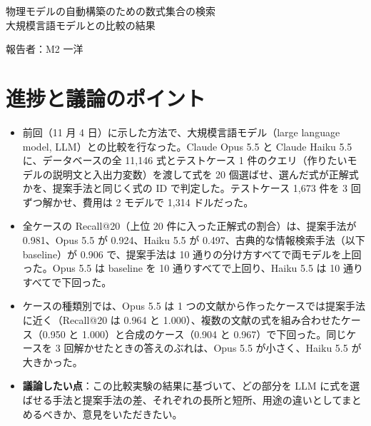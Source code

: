 \documentclass[a4j,dvipdfmx,10pt]{jresume}
\begin{document}

\medskip
\begin{center}
  {\Large 物理モデルの自動構築のための数式集合の検索\\ 大規模言語モデルとの比較の結果}
\end{center}

\begin{flushright}
  報告者：M2\; 一洋 \\
\end{flushright}

\begin{abstract}
本研究の目的は、複数の情報源から収集した数式の中から、作りたいモデルに使える可能性の高い数式を提示する手法を開発することである。提案手法は、第 1 段で数式を作りたいモデルの説明文との近さと入出力変数の重複率で採点して上位 $N_1$ 件に絞り、第 2 段で多層パーセプトロンで並べ直して上位 20 件を提示する。本報告では、2 つの大規模言語モデルに全 11{,}146 式を渡して式を選ばせ、提案手法と比べた。1{,}731 ケースで評価した結果、上位 20 件に入った正解式の割合は、提案手法が 0.981、Claude Opus 5.5 が 0.924、Claude Haiku 5.5 が 0.497 であり、提案手法が 10 通りの分け方すべてで両モデルを上回った。Opus 5.5 は、1 つの文献から作ったケースでは提案手法に近く、複数の文献の式を組み合わせたケースと合成のケースで下回った。
\end{abstract}

\section{進捗と議論のポイント}
\begin{itemize}[leftmargin=1.5em]
  \item 前回（11 月 4 日）に示した方法で、大規模言語モデル（large language model, LLM）との比較を行なった。Claude Opus 5.5 と Claude Haiku 5.5 に、データベースの全 11{,}146 式とテストケース 1 件のクエリ（作りたいモデルの説明文と入出力変数）を渡して式を 20 個選ばせ、選んだ式が正解式かを、提案手法と同じく式の ID で判定した。テストケース 1{,}673 件を 3 回ずつ解かせ、費用は 2 モデルで 1{,}314 ドルだった。
  \item 全ケースの Recall@20（上位 20 件に入った正解式の割合）は、提案手法が 0.981、Opus 5.5 が 0.924、Haiku 5.5 が 0.497、古典的な情報検索手法（以下 baseline）が 0.906 で、提案手法は 10 通りの分け方すべてで両モデルを上回った。Opus 5.5 は baseline を 10 通りすべてで上回り、Haiku 5.5 は 10 通りすべてで下回った。
  \item ケースの種類別では、Opus 5.5 は 1 つの文献から作ったケースでは提案手法に近く（Recall@20 は 0.964 と 1.000）、複数の文献の式を組み合わせたケース（0.950 と 1.000）と合成のケース（0.904 と 0.967）で下回った。同じケースを 3 回解かせたときの答えのぶれは、Opus 5.5 が小さく、Haiku 5.5 が大きかった。
  \item \textbf{議論したい点}：この比較実験の結果に基づいて、どの部分を LLM に式を選ばせる手法と提案手法の差、それぞれの長所と短所、用途の違いとしてまとめるべきか、意見をいただきたい。
\end{itemize}
\end{document}
